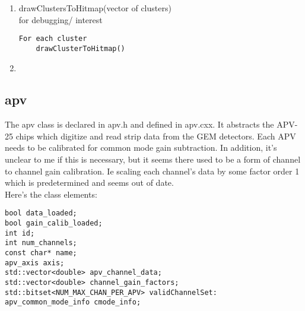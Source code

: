 \documentclass[11pt]{article}
\begin{document}
\begin{enumerate}
		\item drawClustersToHitmap(vector of clusters)\\
		for debugging/ interest
		\begin{lstlisting}
For each cluster
	drawClusterToHitmap()
		\end{lstlisting}
		
		\item 
		\begin{lstlisting}
		\end{lstlisting}
		
	\end{enumerate}
	
	\subsection{apv}
	The apv class is declared in apv.h and defined in apv.cxx. It abstracts the APV-25 chips which digitize and read strip data from the GEM detectors. Each APV needs to be calibrated for common mode gain subtraction. In addition, it's unclear to me if this is necessary, but it seems there used to be a form of channel to channel gain calibration. Ie scaling each channel's data by some factor order 1 which is predetermined and seems out of date.\\
	
	Here's the class elements:
	\begin{lstlisting} 
bool data_loaded;
bool gain_calib_loaded;
int id;
int num_channels;
const char* name;
apv_axis axis;
std::vector<double> apv_channel_data;
std::vector<double> channel_gain_factors;
std::bitset<NUM_MAX_CHAN_PER_APV> validChannelSet:
apv_common_mode_info cmode_info;
	\end{lstlisting}
	
\end{document}
